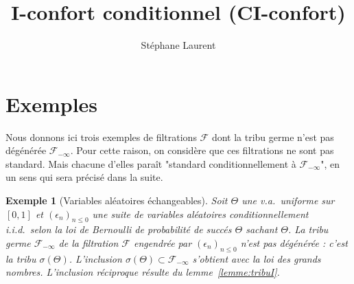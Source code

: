\documentclass[12pt,a4paper]{article}
\author{Stéphane Laurent}
\title{I-confort conditionnel (CI-confort)}
\begin{document}
\theoremstyle{defstyle}
\newtheorem{definition}{Definition}[section]
\newtheorem{remark}{Remark}[section]
\newtheorem{question}{Question}[section]
\newtheorem{clarify}{To clarify}[section]
\newtheorem{remarque}{Remarque}[section]
\newtheorem{exemple}{Exemple}[section]

\theoremstyle{thmstyle}
\newtheorem{thm}{Theorem}[section]
\newtheorem{ppsition}{Proposition}[section]
\newtheorem{lemma}{Lemma}
\newtheorem{lemme}{Lemme}[section]

 

\renewcommand{\AA}{\mathcal{A}}
\newcommand{\BB}{\mathcal{B}}
\newcommand{\CC}{\mathcal{C}}
\newcommand{\EEE}{\mathcal{E}}
\newcommand{\FF}{\mathcal{F}}
\newcommand{\GG}{\mathcal{G}}
\newcommand{\EE}{\mathbb{E}}
\newcommand{\HH}{\mathcal{H}}
\newcommand{\II}{\mathcal{I}}
\newcommand{\LL}{\mathcal{L}}
\newcommand{\OO}{\mathcal{O}}
\newcommand{\PP}{\mathbb{P}}
\newcommand{\XX}{\mathcal{X}}
\newcommand{\given}{\mid}
\newcommand{\biggiven}{\,\big\vert\,}
\newcommand{\eps}{\epsilon}
\newcommand{\indic}{\boldsymbol 1}
\newcommand{\Vb}{\boldsymbol V}
\newcommand{\tildV}{\widetilde{V}}

\newcommand{\indvee}{\dot{\vee}}
\newcommand{\indep}{\mathrel{\text{\scalebox{1.07}{$\perp\mkern-10mu\perp$}}}}

\newcommand{\disp}{\textrm{disp}}

\maketitle

\section{Exemples}

Nous donnons ici trois exemples de filtrations $\FF$ dont la tribu germe 
n'est pas dégénérée $\FF_{-\infty}$. 
Pour cette raison, on considère que ces filtrations ne sont pas standard. 
Mais chacune d'elles para\^it "standard conditionnellement à $\FF_{-\infty}$", 
en un sens qui sera précisé dans la suite. 


\begin{exemple}[Variables aléatoires échangeables]\label{exple:echangeable}
Soit $\Theta$ une v.a.\ uniforme sur $[0,1]$ et ${(\epsilon_n)}_{n \leq 0}$ 
une suite de variables aléatoires conditionnellement i.i.d.\ 
selon la loi de Bernoulli de probabilité de succés $\Theta$ sachant 
$\Theta$. 
La tribu germe $\FF_{-\infty}$ de la filtration $\FF$ engendrée par 
${(\epsilon_n)}_{n \leq 0}$ n'est pas dégénérée : c'est la tribu $\sigma(\Theta)$. 
L'inclusion $\sigma(\Theta) \subset \FF_{-\infty}$ s'obtient avec la loi des 
grands nombres. L'inclusion réciproque 
résulte du lemme~\ref{lemme:tribuI}. 
\end{exemple}
\end{document}
